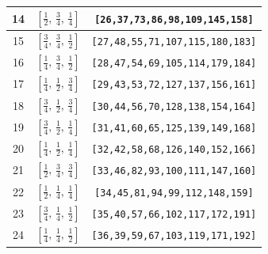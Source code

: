 \documentclass[fleqn,8pt]{jsarticle}
\begin{document}
\begin{longtable}{ccc}
14 & $\left[ \frac{1}{2},\, \frac{3}{4},\, \frac{1}{4} \right]$ & {\tt [26,37,73,86,98,109,145,158]} \\ \hline
15 & $\left[ \frac{3}{4},\, \frac{3}{4},\, \frac{1}{2} \right]$ & {\tt [27,48,55,71,107,115,180,183]} \\ \hline
16 & $\left[ \frac{1}{4},\, \frac{3}{4},\, \frac{1}{2} \right]$ & {\tt [28,47,54,69,105,114,179,184]} \\ \hline
17 & $\left[ \frac{1}{4},\, \frac{1}{2},\, \frac{3}{4} \right]$ & {\tt [29,43,53,72,127,137,156,161]} \\ \hline
18 & $\left[ \frac{3}{4},\, \frac{1}{2},\, \frac{3}{4} \right]$ & {\tt [30,44,56,70,128,138,154,164]} \\ \hline
19 & $\left[ \frac{3}{4},\, \frac{1}{2},\, \frac{1}{4} \right]$ & {\tt [31,41,60,65,125,139,149,168]} \\ \hline
20 & $\left[ \frac{1}{4},\, \frac{1}{2},\, \frac{1}{4} \right]$ & {\tt [32,42,58,68,126,140,152,166]} \\ \hline
21 & $\left[ \frac{1}{2},\, \frac{3}{4},\, \frac{3}{4} \right]$ & {\tt [33,46,82,93,100,111,147,160]} \\ \hline
22 & $\left[ \frac{1}{2},\, \frac{1}{4},\, \frac{1}{4} \right]$ & {\tt [34,45,81,94,99,112,148,159]} \\ \hline
23 & $\left[ \frac{3}{4},\, \frac{1}{4},\, \frac{1}{2} \right]$ & {\tt [35,40,57,66,102,117,172,191]} \\ \hline
24 & $\left[ \frac{1}{4},\, \frac{1}{4},\, \frac{1}{2} \right]$ & {\tt [36,39,59,67,103,119,171,192]} \\
\end{longtable}
\renewcommand{\arraystretch}{1.2}
\end{document}
